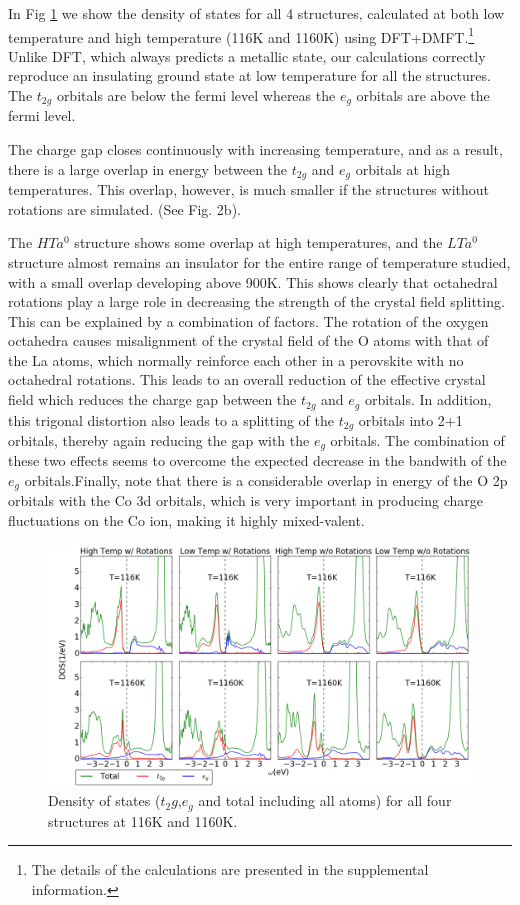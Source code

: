 \documentclass[10pt]{ruthesis}
\begin{document}
{In Fig \ref{LaCoO3_dos} we show the density of states for all 4 structures, calculated at both low temperature and high temperature (116K and 1160K) using DFT+DMFT.\footnote{The details of the calculations are presented in the supplemental information.}  Unlike DFT, which always predicts a metallic state, our calculations correctly reproduce an insulating ground state at low temperature for all the structures. The $t_{2g}$ orbitals are below the fermi level whereas the $e_g$ orbitals are above the fermi level. 

The charge gap closes continuously with increasing temperature, and as a result, there is a large overlap in energy between the $t_{2g}$ and $e_g$ orbitals at high temperatures. This overlap, however, is much smaller if the structures without rotations are simulated. (See Fig. 2b).

The $HTa^0$ structure  shows some overlap at high temperatures, and the $LTa^0$ structure almost remains an insulator for the entire range of temperature studied, with a small overlap developing above 900K. 
%
This shows clearly that octahedral rotations play a large role in decreasing the strength of the crystal field splitting. 
This can be explained by a combination of factors. The rotation of the oxygen octahedra causes misalignment of the crystal field of the O atoms with that of the La atoms, which normally reinforce each other in a  perovskite with no octahedral rotations. This leads to an overall reduction of the effective crystal field which reduces the charge gap between the $t_{2g}$ and $e_g$ orbitals. In addition, this trigonal distortion also leads to a splitting of the $t_{2g}$ orbitals into 2+1 orbitals, thereby again reducing the gap with the $e_g$ orbitals. The combination of these two effects seems to overcome the expected decrease in the bandwith of the $e_g$ orbitals.Finally, note that there is a considerable overlap in energy of the O 2p orbitals with the Co 3d orbitals, which is very important in producing charge fluctuations on the Co ion, making it highly mixed-valent. 

\begin{figure}\label{LaCoO3_dos}
\begin{center}
\includegraphics[width=\columnwidth]{plots_final/output/New_Dos.png}
\caption{Density of states ($t_2g$,$e_g$ and total including all atoms) for all four structures at 116K and 1160K.}
\end{center}
\end{figure}

}
\end{document}
